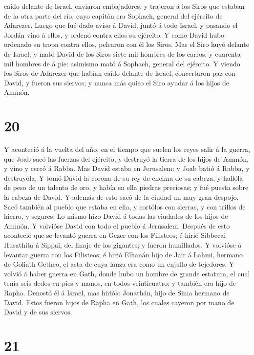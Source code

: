 caído delante de Israel, enviaron embajadores, y trajeron á los Siros
que estaban de la otra parte del río, cuyo capitán era Sophach, general
del ejército de Adarezer.  Luego que fué dado aviso á
David, juntó á todo Israel, y pasando el Jordán vino á ellos, y ordenó
contra ellos su ejército. Y como David hubo ordenado su tropa contra
ellos, pelearon con él los Siros.  Mas el Siro huyó delante
de Israel; y mató David de los Siros siete mil hombres de los carros, y
cuarenta mil hombres de á pie: asimismo mató á Sophach, general del
ejército.  Y viendo los Siros de Adarezer que habían caído
delante de Israel, concertaron paz con David, y fueron sus siervos; y
nunca más quiso el Siro ayudar á los hijos de Ammón.

\hypertarget{section-19}{%
\section{20}\label{section-19}}

 Y aconteció á la vuelta del año, en el tiempo que suelen
los reyes salir á la guerra, que Joab sacó las fuerzas del ejército, y
destruyó la tierra de los hijos de Ammón, y vino y cercó á Rabba. Mas
David estaba en Jerusalem: y Joab batió á Rabba, y destruyóla.
 Y tomó David la corona de su rey de encima de su cabeza, y
hallóla de peso de un talento de oro, y había en ella piedras preciosas;
y fué puesta sobre la cabeza de David. Y además de esto sacó de la
ciudad un muy gran despojo.  Sacó también al pueblo que
estaba en ella, y cortólos con sierras, y con trillos de hierro, y
segures. Lo mismo hizo David á todas las ciudades de los hijos de Ammón.
Y volvióse David con todo el pueblo á Jerusalem.  Después de
esto aconteció que se levantó guerra en Gezer con los Filisteos; é hirió
Sibbecai Husathita á Sippai, del linaje de los gigantes; y fueron
humillados.  Y volvióse á levantar guerra con los Filisteos;
é hirió Elhanán hijo de Jair á Lahmi, hermano de Goliath Getheo, el asta
de cuya lanza era como un enjullo de tejedores.  Y volvió á
haber guerra en Gath, donde hubo un hombre de grande estatura, el cual
tenía seis dedos en pies y manos, en todos veinticuatro: y también era
hijo de Rapha.  Denostó él á Israel, mas hiriólo Jonathán,
hijo de Sima hermano de David.  Estos fueron hijos de Rapha
en Gath, los cuales cayeron por mano de David y de sus siervos.

\hypertarget{section-20}{%
\section{21}\label{section-20}}

